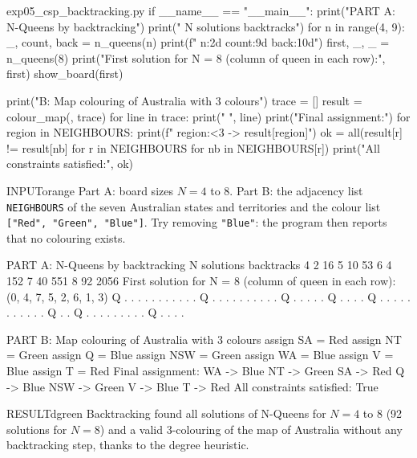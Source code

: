 \documentclass[11pt,a4paper]{article}
\newenvironment{inputbox}{\begin{secbox}{INPUT}{orange}}{\end{secbox}}
\newenvironment{result}{\begin{secbox}{RESULT}{dgreen}}{\end{secbox}}
\begin{document}
\begin{pycode}{exp05\_csp\_backtracking.py}
if __name__ == "__main__":
    print("PART A: N-Queens by backtracking")
    print("   N  solutions  backtracks")
    for n in range(4, 9):
        _, count, back = n_queens(n)
        print(f"  {n:2d}  {count:9d}  {back:10d}")
    first, _, _ = n_queens(8)
    print("First solution for N = 8 (column of queen in each row):", first)
    show_board(first)

    print("\nPART B: Map colouring of Australia with 3 colours")
    trace = []
    result = colour_map({}, trace)
    for line in trace:
        print("  ", line)
    print("Final assignment:")
    for region in NEIGHBOURS:
        print(f"   {region:<3} -> {result[region]}")
    ok = all(result[r] != result[nb] for r in NEIGHBOURS for nb in NEIGHBOURS[r])
    print("All constraints satisfied:", ok)
\end{pycode}

\begin{inputbox}
Part A: board sizes $N = 4$ to $8$. Part B: the adjacency list \texttt{NEIGHBOURS} of the seven Australian states and territories and the colour list \texttt{["Red", "Green", "Blue"]}. Try removing \texttt{"Blue"}: the program then reports that no colouring exists.
\end{inputbox}

\begin{outputbox}
PART A: N-Queens by backtracking
   N  solutions  backtracks
   4          2          16
   5         10          53
   6          4         152
   7         40         551
   8         92        2056
First solution for N = 8 (column of queen in each row): (0, 4, 7, 5, 2, 6, 1, 3)
   Q . . . . . . .
   . . . . Q . . .
   . . . . . . . Q
   . . . . . Q . .
   . . Q . . . . .
   . . . . . . Q .
   . Q . . . . . .
   . . . Q . . . .

PART B: Map colouring of Australia with 3 colours
   assign SA  = Red
   assign NT  = Green
   assign Q   = Blue
   assign NSW = Green
   assign WA  = Blue
   assign V   = Blue
   assign T   = Red
Final assignment:
   WA  -> Blue
   NT  -> Green
   SA  -> Red
   Q   -> Blue
   NSW -> Green
   V   -> Blue
   T   -> Red
All constraints satisfied: True
\end{outputbox}

\begin{result}
Backtracking found all solutions of N-Queens for $N=4$ to $8$ (92 solutions for $N=8$) and a valid 3-colouring of the map of Australia without any backtracking step, thanks to the degree heuristic.
\end{result}
\end{document}
